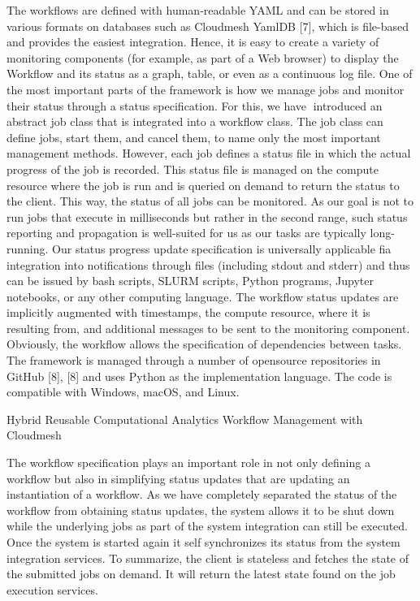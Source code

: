 \documentclass[utf8]{FrontiersinVancouver} %
\begin{document}
The workflows are defined with human-readable YAML and can be stored
in various formats on databases such as Cloudmesh YamlDB [7], which is
file-based and provides the easiest integration. Hence, it is easy to
create a variety of monitoring components (for example, as part of a
Web browser) to display the Workflow and its status as a graph, table,
or even as a continuous log file.  One of the most important parts of
the framework is how we manage jobs and monitor their status through a
status specification. For this, we have introduced an abstract job
class that is integrated into a workflow class. The job class can
define jobs, start them, and cancel them, to name only the most
important management methods. However, each job defines a status file
in which the actual progress of the job is recorded.  This status file
is managed on the compute resource where the job is run and is queried
on demand to return the status to the client. This way, the status of
all jobs can be monitored. As our goal is not to run jobs that execute
in milliseconds but rather in the second range, such status reporting
and propagation is well-suited for us as our tasks are typically
long-running.  Our status progress update specification is universally
applicable fia integration into notifications through files (including
stdout and stderr) and thus can be issued by bash scripts, SLURM
scripts, Python programs, Jupyter notebooks, or any other computing
language. The workflow status updates are implicitly augmented with
timestamps, the compute resource, where it is resulting from, and
additional messages to be sent to the monitoring component. Obviously,
the workflow allows the specification of dependencies between tasks.
The framework is managed through a number of opensource repositories
in GitHub [8], [8] and uses Python as the implementation language. The
code is compatible with Windows, macOS, and Linux.


Hybrid Reusable Computational Analytics Workflow
Management with Cloudmesh



\citep{las-2022-hybrid}
\citep{las-2022-templated}


The workflow specification plays an important role in not only defining a workflow but also in simplifying status updates that are updating an instantiation of a workflow. As we have completely separated the status of the workflow from obtaining status updates, the system allows it to be shut down while the underlying jobs as part of the system integration can still be executed. Once the system is started again it self synchronizes its status from the system integration services. To summarize, the client is stateless and fetches the state of the submitted jobs on demand. It will return the latest state found on the job execution services.
\end{document}
